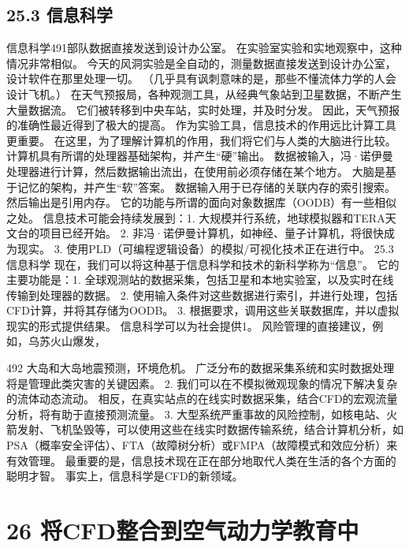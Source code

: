 \documentclass[UTF8,11pt,a4paper,openany,fontset=fandol]{ctexbook}
\begin{document}
\section{25.3 信息科学}
信息科学491部队数据直接发送到设计办公室。 在实验室实验和实地观察中，这种情况非常相似。 今天的风洞实验是全自动的，测量数据直接发送到设计办公室，设计软件在那里处理一切。 （几乎具有讽刺意味的是，那些不懂流体力学的人会设计飞机。） 在天气预报局，各种观测工具，从经典气象站到卫星数据，不断产生大量数据流。 它们被转移到中央车站，实时处理，并及时分发。 因此，天气预报的准确性最近得到了极大的提高。 作为实验工具，信息技术的作用远比计算工具更重要。 在这里，为了理解计算机的作用，我们将它们与人类的大脑进行比较。 计算机具有所谓的处理器基础架构，并产生“硬”输出。 数据被输入，冯·诺伊曼处理器进行计算，然后数据输出流出，在使用前必须存储在某个地方。 大脑是基于记忆的架构，并产生“软”答案。 数据输入用于已存储的关联内存的索引搜索。 然后输出是引用内存。 它的功能与所谓的面向对象数据库（OODB）有一些相似之处。 信息技术可能会持续发展到：1. 大规模并行系统，地球模拟器和TERA天文台的项目已经开始。 2. 非冯·诺伊曼计算机，如神经、量子计算机，将很快成为现实。 3. 使用PLD（可编程逻辑设备）的模拟/可视化技术正在进行中。 25.3 信息科学 现在，我们可以将这种基于信息科学和技术的新科学称为“信息”。 它的主要功能是：1. 全球观测站的数据采集，包括卫星和本地实验室，以及实时在线传输到处理器的数据。 2. 使用输入条件对这些数据进行索引，并进行处理，包括CFD计算，并将其存储为OODB。 3. 根据要求，调用这些关联数据库，并以虚拟现实的形式提供结果。 信息科学可以为社会提供1。 风险管理的直接建议，例如，乌苏火山爆发，

492 大岛和大岛地震预测，环境危机。 广泛分布的数据采集系统和实时数据处理将是管理此类灾害的关键因素。 2. 我们可以在不模拟微观现象的情况下解决复杂的流体动态流动。 相反，在真实站点的在线实时数据采集，结合CFD的宏观流量分析，将有助于直接预测流量。 3. 大型系统严重事故的风险控制，如核电站、火箭发射、飞机坠毁等，可以使用这些在线实时数据传输系统，结合计算机分析，如PSA（概率安全评估）、FTA（故障树分析）或FMPA（故障模式和效应分析）来有效管理。 最重要的是，信息技术现在正在部分地取代人类在生活的各个方面的聪明才智。 事实上，信息科学是CFD的新领域。

\clearpage
\chapter{26 将CFD整合到空气动力学教育中}
\end{document}
